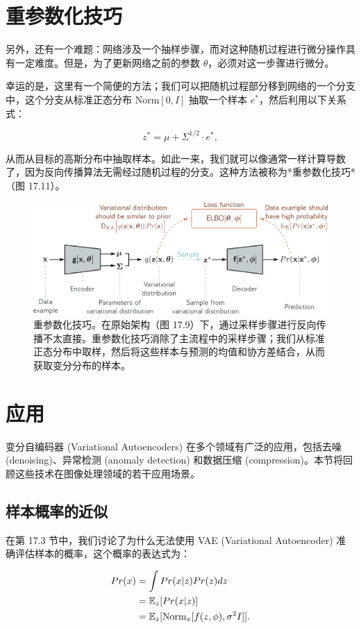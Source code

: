 \section{重参数化技巧}
另外，还有一个难题：网络涉及一个抽样步骤，而对这种随机过程进行微分操作具有一定难度。但是，为了更新网络之前的参数 \(\theta\)，必须对这一步骤进行微分。

幸运的是，这里有一个简便的方法；我们可以把随机过程部分移到网络的一个分支中，这个分支从标准正态分布 \(\text{Norm}[0, I]\) 抽取一个样本 \(e^*\)，然后利用以下关系式：

\begin{equation}
z^* = \mu + \Sigma^{1/2} \cdot e^*, 
\end{equation}

从而从目标的高斯分布中抽取样本。如此一来，我们就可以像通常一样计算导数了，因为反向传播算法无需经过随机过程的分支。这种方法被称为*重参数化技巧*（图 17.11）。

\begin{figure}[ht!]
\centering
\includegraphics[width=0.7\linewidth]{png/chapter17/VAEArch.png}
\caption{重参数化技巧。在原始架构（图 17.9）下，通过采样步骤进行反向传播不太直接。重参数化技巧消除了主流程中的采样步骤；我们从标准正态分布中取样，然后将这些样本与预测的均值和协方差结合，从而获取变分分布的样本。}
\end{figure}


\section{应用}
变分自编码器 (Variational Autoencoders) 在多个领域有广泛的应用，包括去噪 (denoising)、异常检测 (anomaly detection) 和数据压缩 (compression)。本节将回顾这些技术在图像处理领域的若干应用场景。

\subsection{样本概率的近似}
在第 17.3 节中，我们讨论了为什么无法使用 VAE (Variational Autoencoder) 准确评估样本的概率，这个概率的表达式为：


\begin{align}
Pr(x) &= \int Pr(x|z)Pr(z)dz \notag \\
&= \mathbb{E}_{z} [Pr(x|z)] \notag \\
&= \mathbb{E}_{z} [\text{Norm}_x[f(z, \phi), \sigma^2 I]]. 
\end{align}


